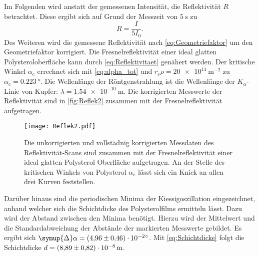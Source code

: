 Im Folgenden wird anstatt der gemessenen Intensität, die Reflektivität $R$ betrachtet. Diese ergibt sich auf Grund der Messzeit von $\qty{5}{\second}$ zu 
\begin{equation*}
  R = \frac{I}{5I_0}.
\end{equation*}
Des Weiteren wird die gemessene Reflektivität nach \autoref{eq:Geometriefaktor} um den Geometriefaktor korrigiert.
Die Fresnelreflektivität einer ideal glatten Polysteroloberfläche kann durch \autoref{eq:Reflektivitaet} genähert werden. Der kritische Winkel $\alpha_\text{c}$ errechnet sich mit
\autoref{eq:alpha_tot} und $r_e\rho = \qty{20e14}{\metre^{-2}}$ \cite{V44} zu $\alpha_\text{c} = \qty{0.223}{\degree}$. Die Wellenlänge der Röntgenstrahlung ist die 
Wellenlänge der $K_\alpha$-Linie von Kupfer: $\lambda = \qty{1.54e-10}{\metre}$.
Die korrigierten Messwerte der Reflektivität sind in \autoref{fig:Reflek2} zusammen mit der Fresnelreflektivität aufgetragen.
\begin{figure}
  \centering
  \texttt{[image: Reflek2.pdf]}
  \caption{Die unkorrigierten und vollstädnig korrigierten Messdaten des Reflektivität-Scans sind zusammen mit der Fresnelreflektivität einer 
  ideal glatten Polysterol Oberfläche aufgetragen. An der Stelle des kritischen Winkels von Polysterol $\alpha_\text{c}$ lässt sich ein Knick an allen drei Kurven feststellen.}
  \label{fig:Reflek2}
\end{figure}
Darüber hinaus sind die periodischen Minima der Kiessigoszillation eingezeichnet, anhand welcher sich die Schichtdicke des Polysterolfilms ermitteln lässt.
Dazu wird der Abstand zwischen den Minima benötigt. Hierzu wird der Mittelwert und die Standardabweichung der Abstände der markierten Messwerte gebildet. Es ergibt sich 
$\symup{\Delta}\alpha = \qty{4.96 +- 0.46e-2}{\degree}$. Mit \autoref{eq:Schichtdicke} folgt die Schichtdicke $d = \qty{8.89 +- 0.82e-8}{\metre}$.

